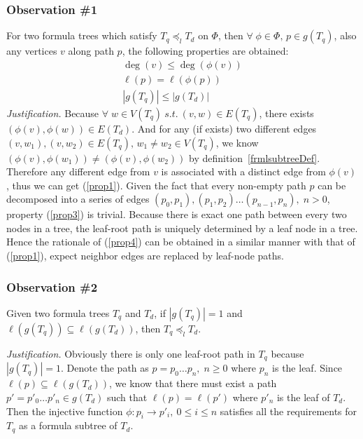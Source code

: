 \subsubsection{Observation \#1} 
\label{observation1}
For two formula trees which satisfy $T_q \preceq_l T_d$ on $\Phi$, then $\forall\; \phi \in \Phi,\, p \in g(T_q)$, also any vertices $v$ along path $p$, the following properties are obtained:
\begin{eqnarray}
\deg(v) \le \deg(\phi(v)) \label{prop1} \\
\ell(p) = \ell(\phi(p)) \label{prop3} \\
\left| g(T_q) \right| \le \left| g(T_d) \right| \label{prop4}
\end{eqnarray}
\textit{Justification.} 
Because $\forall\; w \in V(T_q) \  s.t. \  (v, w) \in E(T_q)$, there exists $(\phi(v), \phi(w)) \in E(T_d)$. 
And for any (if exists) two different edges $(v, w_1), (v, w_2) \in E(T_q),\, w_1 \not= w_2 \in V(T_q) $, we know $(\phi(v), \phi(w_1)) \not= (\phi(v), \phi(w_2))$ by definition~\ref{frmlsubtreeDef}. 
Therefore any different edge from $v$ is associated with a distinct edge from $\phi(v)$, thus we can get (\ref{prop1}). 
Given the fact that every non-empty path $p$ can be decomposed into a series of edges $(p_0, p_1), (p_1, p_2) \ldots (p_{n-1}, p_n), \; n > 0$,
property (\ref{prop3}) is trivial.
Because there is exact one path between every two nodes in a tree, the leaf-root path is uniquely determined by a leaf node in a tree. Hence the rationale of (\ref{prop4}) can be obtained in a similar manner with that of (\ref{prop1}), expect neighbor edges are replaced by leaf-node paths.


\subsubsection{Observation \#2} 
\label{observation2}
Given two formula trees $T_q$ and $T_d$, if $\left| g(T_q) \right| = 1$ and $\ell(g(T_{q})) \subseteq \ell(g(T_d))$, then $T_q \preceq_l T_d$.

\noindent \textit{Justification.} 
Obviously there is only one leaf-root path in $T_q$ because $\left| g(T_q) \right| = 1$. 
Denote the path as $p = p_0 \ldots p_n,\; n \ge 0$ where $p_n$ is the leaf.
Since $\ell(p) \subseteq \ell(g(T_d))$, we know that there must exist a path $p'=p'_0 \ldots p'_n \in g(T_d)$ such that $\ell(p) = \ell(p')$ 
where $p'_n$ is the leaf of $T_d$.
Then
the injective function $\phi: p_i \rightarrow p'_i,\  0 \le i \le n$ satisfies all the requirements for $T_q$ as a formula subtree of $T_d$.

